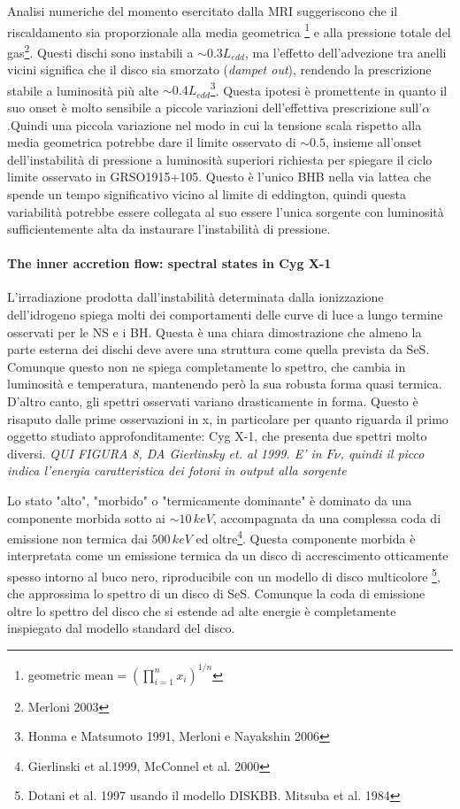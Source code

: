 \documentclass[a4paperbi]{article}
\begin{document}
	Analisi numeriche del momento esercitato dalla MRI suggeriscono che il riscaldamento sia proporzionale alla media geometrica \footnote{geometric mean$=\left(\prod_{i=1}^n x_i\right)^{1/n}$} e alla pressione totale del gas\footnote{Merloni 2003}. Questi dischi sono instabili a $\sim 0.3L_{edd}$, ma l'effetto dell'advezione tra anelli vicini significa che il disco sia smorzato (\textit{dampet out}), rendendo la prescrizione stabile a luminosità più alte $\sim 0.4L_{edd}$\footnote{Honma e Matsumoto 1991, Merloni e Nayakshin 2006}. Questa ipotesi è promettente in quanto il suo onset è molto sensibile a piccole variazioni dell'effettiva prescrizione sull'$\alpha$.Quindi una piccola variazione nel modo in cui la tensione scala rispetto alla media geometrica potrebbe dare il limite osservato di $\sim0.5$, insieme all'onset dell'instabilità di pressione a luminosità superiori richiesta per spiegare il ciclo limite osservato in GRSO1915+105. Questo è l'unico BHB nella via lattea che spende un tempo significativo vicino al limite di eddington, quindi questa variabilità potrebbe essere collegata al suo essere l'unica sorgente con luminosità sufficientemente alta da instaurare l'instabilità di pressione.
	
\paragraph{The inner accretion flow: spectral states in Cyg X-1}
L'irradiazione prodotta dall'instabilità determinata dalla ionizzazione dell'idrogeno spiega molti dei comportamenti delle curve di luce a lungo termine osservati per le NS e i BH. Questa è una chiara dimostrazione che almeno la parte esterna dei dischi deve avere una struttura come quella prevista da SeS. Comunque questo non ne spiega completamente lo spettro, che cambia in luminosità e temperatura, mantenendo però la sua robusta forma quasi termica. D'altro canto, gli spettri osservati variano drasticamente in forma. Questo è risaputo dalle prime osservazioni in x, in particolare per quanto riguarda il primo oggetto studiato approfonditamente: Cyg X-1, che presenta due spettri molto diversi.
\emph{QUI FIGURA 8, DA Gierlinsky et. al 1999. E' in $F\nu$, quindi il picco indica l'energia caratteristica dei fotoni in output alla sorgente}

Lo stato "alto", "morbido" o "termicamente dominante" è dominato da una componente morbida sotto ai $\sim10\,keV$, accompagnata da una complessa coda di emissione non termica dai $500\,keV$ ed oltre\footnote{Gierlinski et al.1999, McConnel et al. 2000}. Questa componente morbida è interpretata come un emissione termica da un disco di accrescimento otticamente spesso intorno al buco nero, riproducibile con un modello di disco multicolore \footnote{Dotani et al. 1997 usando il modello DISKBB. Mitsuba et al. 1984}, che approssima lo spettro di un disco di SeS. Comunque la coda di emissione oltre lo spettro del disco che si estende ad alte energie è completamente inspiegato dal modello standard del disco.
\end{document}
